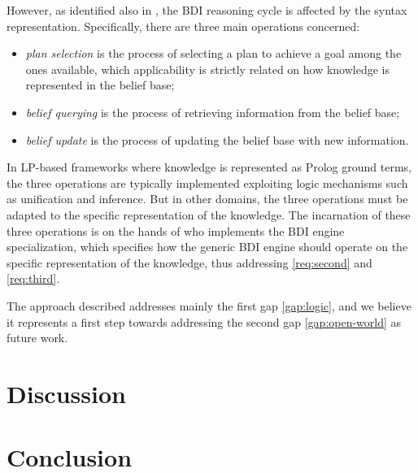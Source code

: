 \documentclass[
]{ceurart}
\begin{document}
However,
as identified also in \cite{DBLP:conf/dalt/MoreiraVBH05}, 
the \ac{BDI} reasoning cycle is affected by the syntax representation.
%
Specifically,
there are three main operations concerned:
\begin{itemize} 
  \item \emph{plan selection} is the process of selecting a plan to achieve a goal among the ones available, 
  which applicability is strictly related on how knowledge is represented in the belief base;
  \item \emph{belief querying} is the process of retrieving information from the belief base;
  \item \emph{belief update} is the process of updating the belief base with new information.
\end{itemize}
%
In \ac{LP}-based frameworks where knowledge is represented as Prolog ground terms, 
the three operations are typically implemented exploiting logic mechanisms such as unification and inference.
%
But in other domains,
the three operations must be adapted to the specific representation of the knowledge.
%
The incarnation of these three operations is on the hands of who implements the \ac{BDI} engine specialization,
which specifies how the generic \ac{BDI} engine should operate on the specific representation of the knowledge,
thus addressing \ref{req:second} and \ref{req:third}. 

%
The approach described addresses mainly the first gap \ref{gap:logic}, 
and we believe it represents a first step towards addressing the second gap \ref{gap:open-world} as future work.




\section{Discussion}
\label{sec:discussion}


\section{Conclusion}
\label{sec:conclusion}
\end{document}

